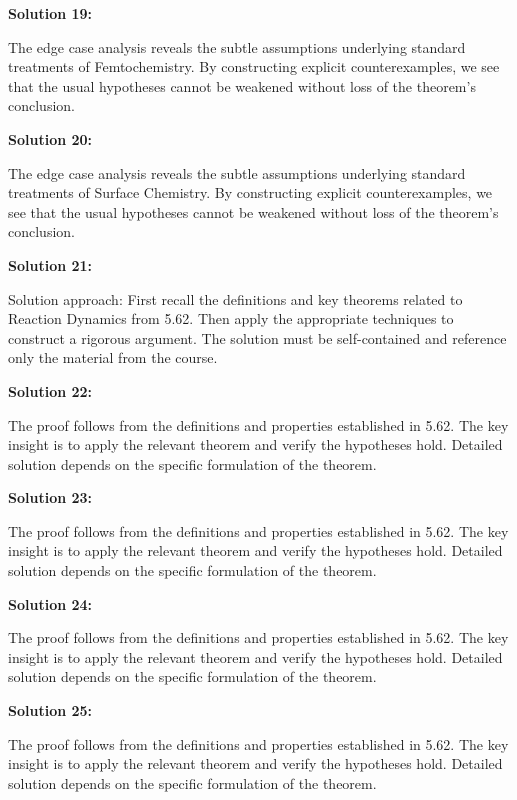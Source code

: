 \documentclass[12pt,a4paper]{exam}
\begin{document}
\vspace{0.5cm}

\textbf{Solution 19:}

The edge case analysis reveals the subtle assumptions underlying standard treatments of Femtochemistry. By constructing explicit counterexamples, we see that the usual hypotheses cannot be weakened without loss of the theorem's conclusion.

\vspace{0.5cm}

\textbf{Solution 20:}

The edge case analysis reveals the subtle assumptions underlying standard treatments of Surface Chemistry. By constructing explicit counterexamples, we see that the usual hypotheses cannot be weakened without loss of the theorem's conclusion.

\vspace{0.5cm}

\textbf{Solution 21:}

Solution approach: First recall the definitions and key theorems related to Reaction Dynamics from 5.62. Then apply the appropriate techniques to construct a rigorous argument. The solution must be self-contained and reference only the material from the course.

\vspace{0.5cm}

\textbf{Solution 22:}

The proof follows from the definitions and properties established in 5.62. The key insight is to apply the relevant theorem and verify the hypotheses hold. Detailed solution depends on the specific formulation of the theorem.

\vspace{0.5cm}

\textbf{Solution 23:}

The proof follows from the definitions and properties established in 5.62. The key insight is to apply the relevant theorem and verify the hypotheses hold. Detailed solution depends on the specific formulation of the theorem.

\vspace{0.5cm}

\textbf{Solution 24:}

The proof follows from the definitions and properties established in 5.62. The key insight is to apply the relevant theorem and verify the hypotheses hold. Detailed solution depends on the specific formulation of the theorem.

\vspace{0.5cm}

\textbf{Solution 25:}

The proof follows from the definitions and properties established in 5.62. The key insight is to apply the relevant theorem and verify the hypotheses hold. Detailed solution depends on the specific formulation of the theorem.

\vspace{0.5cm}
\end{document}
